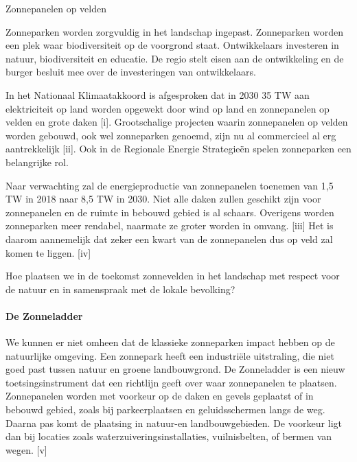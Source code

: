 \begin{voorstel}{Zonnepanelen op velden}

\begin{samenvatting}
Zonneparken worden zorgvuldig in het landschap ingepast. Zonneparken worden een plek waar biodiversiteit op de voorgrond staat. Ontwikkelaars investeren in natuur, biodiversiteit en educatie. De regio stelt eisen aan de ontwikkeling en de burger besluit mee over de investeringen van ontwikkelaars.
\end{samenvatting}

\begin{multicols}{2}

\begin{uitdaging}
In het Nationaal Klimaatakkoord is afgesproken dat in 2030 35 TW aan elektriciteit op land worden opgewekt door wind op land en zonnepanelen op velden en grote daken [i]. Grootschalige projecten waarin zonnepanelen op velden worden gebouwd, ook wel zonneparken genoemd, zijn nu al commercieel al erg aantrekkelijk [ii]. Ook in de Regionale Energie Strategieën spelen zonneparken een belangrijke rol.

Naar verwachting zal de energieproductie van zonnepanelen toenemen van 1,5 TW in 2018 naar 8,5 TW in 2030. Niet alle daken zullen geschikt zijn voor zonnepanelen en de ruimte in bebouwd gebied is al schaars. Overigens worden zonneparken meer rendabel, naarmate ze groter worden in omvang. [iii] Het is daarom aannemelijk dat zeker een kwart van de zonnepanelen dus op veld zal komen te liggen. [iv]

Hoe plaatsen we in de toekomst zonnevelden in het landschap met respect voor de natuur en in samenspraak met de lokale bevolking?
\end{uitdaging}

\begin{overwegingen}
\paragraph{De Zonneladder}
We kunnen er niet omheen dat de klassieke zonneparken impact hebben op de natuurlijke omgeving. Een zonnepark heeft een industriële uitstraling, die niet goed past tussen natuur en groene landbouwgrond. De Zonneladder is een nieuw toetsingsinstrument dat een richtlijn geeft over waar zonnepanelen te plaatsen. Zonnepanelen worden met voorkeur op de daken en gevels geplaatst of in bebouwd gebied, zoals bij parkeerplaatsen en geluidsschermen langs de weg. Daarna pas komt de plaatsing in natuur-en landbouwgebieden. De voorkeur ligt dan bij locaties zoals waterzuiveringsinstallaties, vuilnisbelten, of bermen van wegen. [v]

\end{overwegingen}
\end{multicols}
\end{voorstel}
